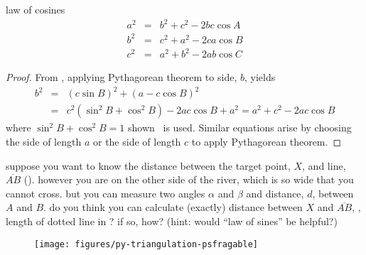 \documentclass[17pt,landscape]{foils}
\begin{document}
\begin{mylaw}{law of cosines}
\begin{eqnarray*}
a^2 &=& b^2 + c^2 - 2bc \cos A
\\
b^2 &=& c^2 + a^2 - 2ca \cos B
\\
c^2 &=& a^2 + b^2 - 2ab \cos C
\end{eqnarray*}
\end{mylaw}
\vfill
\begin{proof}
From , applying Pythagorean theorem to side, $b$,
yields
\begin{eqnarray*}
b^2
& = &
(c\sin B)^2 + (a-c\cos B)^2
\\
&=&
c^2 (\sin^2 B + \cos^2 B) - 2ac \cos B + a^2
=
a^2 + c^2 - 2ac \cos B
\end{eqnarray*}
where $\sin^2 B + \cos^2 B=1$ shown \ is used.
Similar equations arise by choosing the side of length $a$ or the side of length $c$
to apply Pythagorean theorem.
\end{proof}
\bit
\item
suppose you want to know the distance between the target point, $X$, and line, $\overline{AB}$ ().
however you are on the other side of the river,
which is so wide that you cannot cross.
but you can measure two angles $\alpha$ and $\beta$ and distance, $d$, between $A$ and $B$.
\vitem
do you think you can calculate (exactly) distance between $X$ and $\overline{AB}$,
\ie, length of dotted line in ?
if so, how?
(hint: would ``law of sines'' be helpful?)
\eit
\begin{figure}
\begin{center}
\texttt{[image: figures/py-triangulation-psfragable]}
\label{fig:triangulation}
\end{center}
\end{figure}
\end{document}
